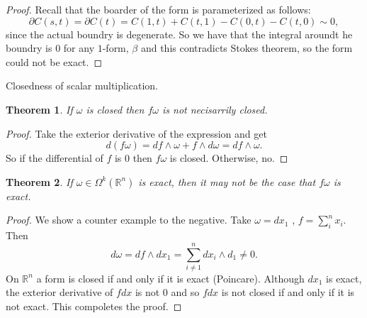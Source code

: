 \documentclass[letter]{article}
\newtheorem{theorem}{Theorem}
\newenvironment{menumerate}{%
  \edef\backupindent{\the\parindent}%
  \enumerate%
  \setlength{\parindent}{\backupindent}%
}{\endenumerate}
\begin{document}
\begin{menumerate}
\begin{proof}
		Recall that the boarder of the form is parameterized as follows:
		\begin{equation}
			\partial C(s,t) = \partial C(t) = C(1,t) + C(t,1) - C(0,t) - C(t,0) \sim 0,	
		\end{equation}
		since the actual boundry is degenerate. So we have that the integral aroundt he boundry
		is $0$ for any $1$-form, $\beta$ and this contradicts Stokes theorem, so the form could not be exact.                
 	\end{proof}
	\setcounter{enumi}{67}
	\item Closedness of scalar multiplication.
	 \begin{theorem}
		If $\omega$ is closed then $f\omega$ is not necisarrily closed.	
	\end{theorem}
	\begin{proof}
		Take the exterior derivative of the expression and get
		\begin{equation}
		d(f\omega) = df \wedge \omega + f \wedge d\omega = df \wedge \omega.
		\end{equation}
		So if the differential of $f$ is $0$ then $f\omega$ is closed. Otherwise, no.
	\end{proof}
	\begin{theorem}
		If $\omega \in \Omega^k(\mathbb{R}^n)$ is exact, then it may not be the case that
		$f\omega$ is exact.
	\end{theorem}
	\begin{proof}
		We show a counter example to the negative. Take $\omega = dx_1$ , $f = \sum_i^n x_i.$ Then
		\begin{equation}
		d\omega = df \wedge dx_1 = \sum_{i\neq 1}^n dx_i \wedge d_1 \neq 0.
		\end{equation}
		On $\mathbb{R}^n$ a form is closed if and only if it is exact (Poincare). Although 
		$dx_1$ is exact, the exterior derivative of $fdx$ is not $0$ and so $fdx$ is not closed if and only if
		it is not exact. This compoletes the proof.
	\end{proof}


\end{menumerate}
\end{document}
